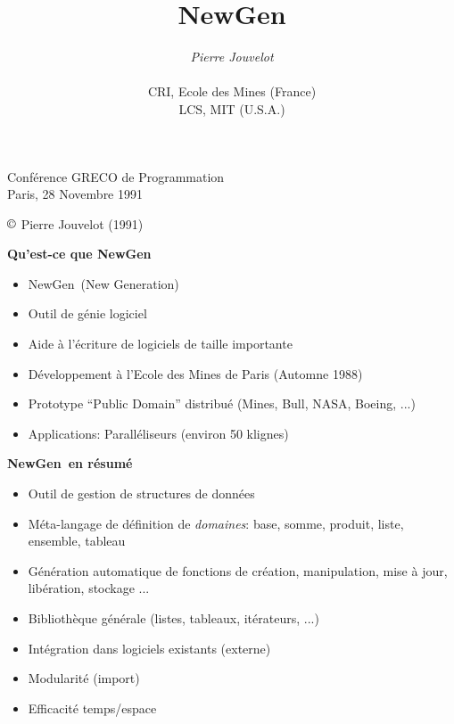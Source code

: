 \documentclass[11pt]{article}
\title{\Huge NewGen}
\author{\huge {\em Pierre Jouvelot} \\
        \\
        \huge CRI, Ecole des Mines (France) \\
        \huge LCS, MIT (U.S.A.)}
\date{}
\newcommand{\newgen}{NewGen}
\begin{document}
{\LARGE
\sloppypar

\maketitle

\vskip 3cm

\begin{center}
Conférence GRECO de Programmation
~\\
Paris, 28 Novembre 1991
\end{center}

\vskip 3cm

\begin{center}
$\copyright$ Pierre Jouvelot (1991)
\end{center}

\newpage

\begin{center}
{\huge\bf Qu'est-ce que NewGen}
\end{center}

\vskip 2cm

\begin{itemize}
\item \newgen~(New Generation)
\item Outil de génie logiciel
\item Aide à l'écriture de logiciels de taille importante
\item Développement à l'Ecole des Mines de Paris (Automne 1988)
\item Prototype ``Public Domain'' distribué (Mines, Bull, NASA, Boeing, ...)
\item Applications: Paralléliseurs (environ 50 klignes)
\end{itemize}

\newpage

\begin{center}
{\huge\bf \newgen~en résumé}
\end{center}

\vskip 2cm

\begin{itemize}
\item Outil de gestion de structures de données
\item Méta-langage de définition de {\em domaines}: base, somme,
produit, liste, ensemble, tableau
\item Génération automatique de fonctions de création, manipulation,
mise à jour, libération, stockage ...
\item Bibliothèque générale (listes, tableaux, itérateurs, ...)
\item Intégration dans logiciels existants (externe)
\item Modularité (import)
\item Efficacité temps/espace
\end{itemize}

}
\end{document}
